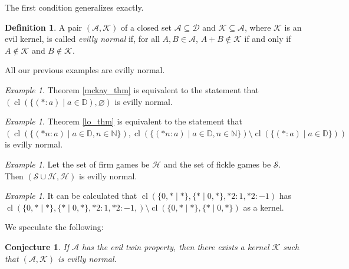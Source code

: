 \documentclass{amsart}
\theoremstyle{plain}
\newtheorem{conj}[thm]{Conjecture}
\theoremstyle{definition}
\newtheorem{defn}[thm]{Definition}
\theoremstyle{remark}
\newtheorem{ex}[thm]{Example}
\numberwithin{equation}{section}
\numberwithin{thm}{section}
\DeclareMathOperator{\cl}{cl}
\begin{document}
The first condition generalizes exactly.
\begin{defn}
    A pair $(\mathscr{A},\mathscr{K})$ of  a closed set $\mathscr{A} \subseteq \mathscr{D}$ and $ \mathscr{K} \subseteq \mathscr{A}$, where $\mathscr{K}$ is an evil kernel, is called \emph{evilly normal} if, for all $A,B \in \mathscr{A}$, $A+B \notin \mathscr{K}$ if and only if $A \not\in \mathscr{K} $ and $B \notin \mathscr{K}$.
\end{defn}
All our previous examples are evilly normal.
\begin{ex}
Theorem    \ref{mckay_thm} is equivalent to the statement that $(\cl(\{(*:a)\mid a \in \mathbb{D}),\varnothing)$ is evilly normal.
\end{ex}
\begin{ex}
  Theorem  \ref{lo_thm} is equivalent to the statement that $(\cl(\{(*n:a)\mid  a \in \mathbb{D},n \in \mathbb{N}\}),\cl(\{(*n:a)\mid a \in \mathbb{D},n \in \mathbb{N}\})\setminus\cl(\{(*:a)\mid a \in \mathbb{D}\}))$ is evilly normal.\end{ex}
\begin{ex}
Let the set of firm games be $\mathscr{H}$ and the set of fickle games be $\mathscr{S}$. Then $(\mathscr{S}\cup \mathscr{H}, \mathscr{H})$  is evilly normal.
\end{ex}
\begin{ex}
  \label{star based counterexample}
    It can be calculated that $\cl (\{0,* \mid *\} , \{*\mid 0,*\}, *2: 1 , *2:-1)$ has $\cl (\{0,* \mid *\} , \{*\mid 0,*\}, *2:1, *2:-1,) \setminus \cl (\{0,* \mid *\} , \{*\mid 0,*\})$ as a kernel.
\end{ex}

We speculate the following:

\begin{conj}
\label{all_norm}
If $\mathscr{A}$ has the evil twin property, then there exists a kernel $\mathscr{K}$ such that $(\mathscr{A},\mathscr{K})$ is evilly normal.
\end{conj}
\end{document}
